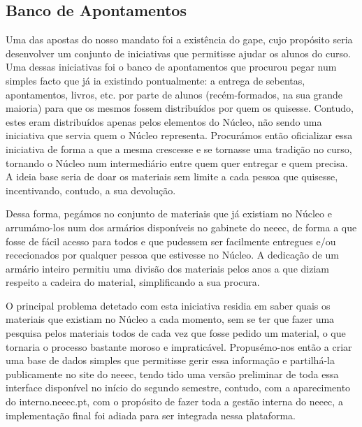 
\subsection{Banco de Apontamentos}

Uma das apostas do nosso mandato foi a existência do \acrfull{gape}, cujo propósito seria desenvolver um conjunto de iniciativas que permitisse ajudar os alunos do curso. Uma dessas iniciativas foi o banco de apontamentos que procurou pegar num simples facto que já ia existindo pontualmente: a entrega de sebentas, apontamentos, livros, etc. por parte de alunos (recém-formados, na sua grande maioria) para que os mesmos fossem distribuídos por quem os quisesse. Contudo, estes eram distribuídos apenas pelos elementos do Núcleo, não sendo uma iniciativa que servia quem o Núcleo representa. Procurámos então oficializar essa iniciativa de forma a que a mesma crescesse e se tornasse uma tradição no curso, tornando o Núcleo num intermediário entre quem quer entregar e quem precisa. A ideia base seria de doar os materiais sem limite a cada pessoa que quisesse, incentivando, contudo, a sua devolução.

Dessa forma, pegámos no conjunto de materiais que já existiam no Núcleo e arrumámo-los num dos armários disponíveis no gabinete do \acrshort{neeec}, de forma a que fosse de fácil acesso para todos e que pudessem ser facilmente entregues e/ou rececionados por qualquer pessoa que estivesse no Núcleo. A dedicação de um armário inteiro permitiu uma divisão dos materiais pelos anos a que diziam respeito a cadeira do material, simplificando a sua procura.

O principal problema detetado com esta iniciativa residia em saber quais os materiais que existiam no Núcleo a cada momento, sem se ter que fazer uma pesquisa pelos materiais todos de cada vez que fosse pedido um material, o que tornaria o processo bastante moroso e impraticável. Propusémo-nos então a criar uma base de dados simples que permitisse gerir essa informação e partilhá-la publicamente no site do \acrshort{neeec}, tendo tido uma versão preliminar de toda essa interface disponível no início do segundo semestre, contudo, com a aparecimento do interno.neeec.pt, com o propósito de fazer toda a gestão interna do \acrshort{neeec}, a implementação final foi adiada para ser integrada nessa plataforma.

